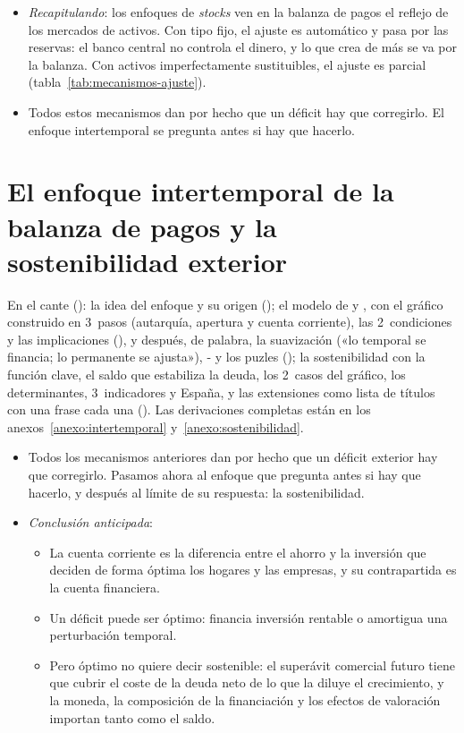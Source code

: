 \documentclass[11pt]{article}
\begin{document}
\begin{itemize}
\item \emph{Recapitulando}: los enfoques de \emph{stocks} ven en la balanza de pagos el reflejo de los mercados de activos. Con tipo fijo, el ajuste es automático y pasa por las reservas: el banco central no controla el dinero, y lo que crea de más se va por la balanza. Con activos imperfectamente sustituibles, el ajuste es parcial (tabla~\ref{tab:mecanismos-ajuste}).
\item Todos estos mecanismos dan por hecho que un déficit hay que corregirlo. El enfoque intertemporal se pregunta antes si hay que hacerlo.
\end{itemize}

\section{El enfoque intertemporal de la balanza de pagos\cortetitulo{} y la sostenibilidad exterior}\label{sec:intertemporal}

\begin{notaopositor}
En el cante (): la idea del enfoque y su origen (); el modelo de  y , con el gráfico construido en 3~pasos (autarquía, apertura y cuenta corriente), las 2~condiciones y las implicaciones (), y después, de palabra, la suavización («lo temporal se financia; lo permanente se ajusta»), - y los puzles (); la sostenibilidad con la función clave, el saldo que estabiliza la deuda, los 2~casos del gráfico, los determinantes, 3~indicadores y España, y las extensiones como lista de títulos con una frase cada una (). Las derivaciones completas están en los anexos~\ref{anexo:intertemporal} y~\ref{anexo:sostenibilidad}.
\end{notaopositor}

\begin{itemize}
\item Todos los mecanismos anteriores dan por hecho que un déficit exterior hay que corregirlo. Pasamos ahora al enfoque que pregunta antes si hay que hacerlo, y después al límite de su respuesta: la sostenibilidad.
\item \emph{Conclusión anticipada}:
  \begin{itemize}
  \item La cuenta corriente es la diferencia entre el ahorro y la inversión que deciden de forma óptima los hogares y las empresas, y su contrapartida es la cuenta financiera.
  \item Un déficit puede ser óptimo: financia inversión rentable o amortigua una perturbación temporal.
  \item Pero óptimo no quiere decir sostenible: el superávit comercial futuro tiene que cubrir el coste de la deuda neto de lo que la diluye el crecimiento, y la moneda, la composición de la financiación y los efectos de valoración importan tanto como el saldo.
  \end{itemize}
\end{itemize}
\end{document}
